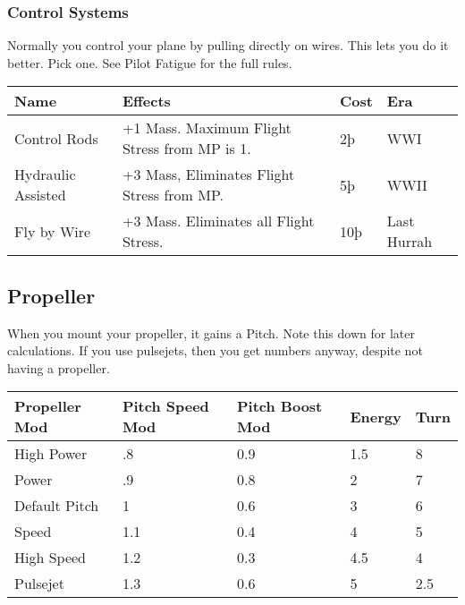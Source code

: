 \documentclass{article}
\begin{document}
\subsubsection{Control Systems}
\label{_Control_Systems}

Normally you control your plane by pulling directly on wires. This lets
you do it better. Pick one. See Pilot Fatigue for the full rules.

\begin{tabular}{|l|l|l|l|}
    \hline
    Name               & Effects                                      & Cost & Era  \\\hline
    Control Rods       & +1 Mass. Maximum Flight Stress from MP is 1. & 2þ   &
    WWI                                                                             \\\hline
    Hydraulic Assisted & +3 Mass, Eliminates Flight Stress from MP.   & 5þ   &
    WWII                                                                            \\\hline
    Fly by Wire        & +3 Mass. Eliminates all Flight Stress.       & 10þ  & Last
    Hurrah                                                                          \\\hline
\end{tabular}

\subsection{Propeller}
\label{_Propeller}

When you mount your propeller, it gains a Pitch. Note this down for
later calculations.  If you use pulsejets, then you get numbers anyway,
despite not having a propeller.

\begin{tabular}{|l|l|l|l|l|}
    \hline
    Propeller Mod & Pitch Speed Mod & Pitch Boost Mod & Energy & Turn \\\hline
    High Power    & .8              & 0.9             & 1.5    & 8    \\\hline
    Power         & .9              & 0.8             & 2      & 7    \\\hline
    Default Pitch & 1               & 0.6             & 3      & 6    \\\hline
    Speed         & 1.1             & 0.4             & 4      & 5    \\\hline
    High Speed    & 1.2             & 0.3             & 4.5    & 4    \\\hline
    Pulsejet      & 1.3             & 0.6             & 5      & 2.5  \\\hline
\end{tabular}
\end{document}
